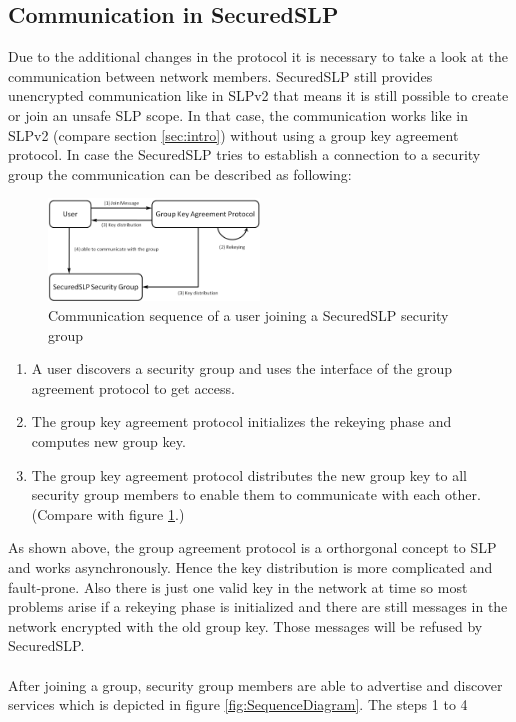 \subsection{Communication in SecuredSLP}
Due to the additional changes in the protocol it is necessary to take a look at the communication between network members. SecuredSLP still provides unencrypted communication like in SLPv2 that means it is still possible to create or join an unsafe SLP scope. In that case, the communication works like in SLPv2 (compare section \ref{sec:intro}) without using a group key agreement protocol. In case the SecuredSLP tries to establish a connection to a security group the communication can be described as following:
\begin{figure}[!h]
\centering\includegraphics[width=0.5\textwidth]{Images/sSLP_join}
\caption{Communication sequence of a user joining a SecuredSLP security group}
\label{fig:sslp_join}
\end{figure}
\begin{enumerate}
  \item A user discovers a security group and uses the interface of the group agreement protocol to get access.
  \item The group key agreement protocol initializes the rekeying phase and computes new group key.
  \item The group key agreement protocol distributes the new group key to all security group members to enable them to communicate with each other. (Compare with figure \ref{fig:sslp_join}.)
\end{enumerate}
As shown above, the group agreement protocol is a orthorgonal concept to SLP and works asynchronously. Hence the key distribution is more
complicated and fault-prone. Also there is just one valid key in the network at
time so most problems arise if a rekeying phase is initialized and there are
still messages in the network encrypted with the old group key. Those messages
will be refused by SecuredSLP.\\\\ After joining a group, security group members are able to
advertise and discover services which is depicted in figure
\ref{fig:SequenceDiagram}. The steps 1 to 4
